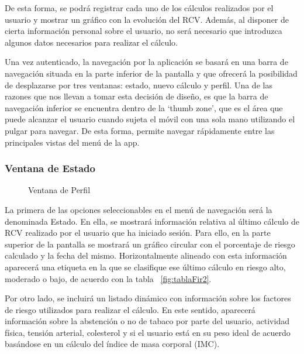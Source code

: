 De esta forma, se podrá registrar cada uno de los cálculos realizados por el usuario y mostrar un gráfico con la evolución del RCV. Además, al disponer de cierta información personal sobre el usuario, no será necesario que introduzca algunos datos necesarios para realizar el cálculo.

Una vez autenticado, la navegación por la aplicación se basará en una barra de navegación situada en la parte inferior de la pantalla y que ofrecerá la posibilidad de desplazarse por tres ventanas: estado, nuevo cálculo y perfil. Una de las razones que nos llevan a tomar esta decisión de diseño, es que la barra de navegación inferior se encuentra dentro de la ‘thumb zone’, que es el área que puede alcanzar el usuario cuando sujeta el móvil con una sola mano utilizando el pulgar para navegar. De esta forma, permite navegar rápidamente entre las principales vistas del menú de la app. 

\subsubsection{Ventana de Estado}

\begin{wrapfigure}{r}{0.3\linewidth}
	\centering
		\caption[Ventana de Perfil y Estado]{Ventana de Perfil}
	
	\label{fig:defPerfil}
\end{wrapfigure}
La primera de las opciones seleccionables en el menú de navegación será la denominada Estado. En ella, se mostrará información relativa al último cálculo de RCV realizado por el usuario que ha iniciado sesión. Para ello, en la parte superior de la pantalla se mostrará un gráfico circular con el porcentaje de riesgo calculado y la fecha del mismo. Horizontalmente alineado con esta información aparecerá una etiqueta en la que se clasifique ese último cálculo en riesgo alto, moderado o bajo, de acuerdo con la tabla ~\ref{fig:tablaFir2}.

Por otro lado, se incluirá un listado dinámico con información sobre los factores de riesgo utilizados para realizar el cálculo. En este sentido, aparecerá información sobre la abstención o no de tabaco por parte del usuario, actividad física, tensión arterial, colesterol y si el usuario está en su peso ideal de acuerdo basándose en un cálculo del índice de masa corporal (IMC).


